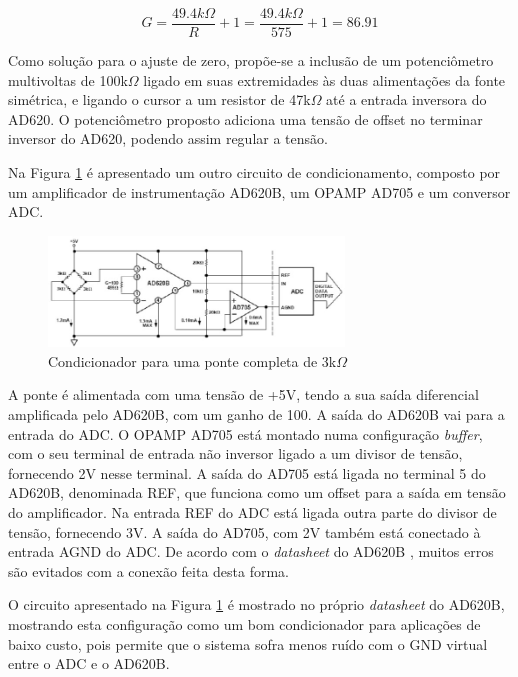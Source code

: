 \documentclass[a4paper]{instrumentacao}
\begin{document}
\begin{equation}
	G=\frac{49.4k\Omega}{R}+1=\frac{49.4k\Omega}{575}+1=86.91
	\label{eq:ganho-AD620}
\end{equation}

Como solução para o ajuste de zero, propõe-se a inclusão de um potenciômetro multivoltas de 100k$\Omega$ ligado em suas extremidades às duas alimentações da fonte simétrica, e ligando o cursor a um resistor de 47k$\Omega$ até a entrada inversora do AD620. O potenciômetro proposto adiciona uma tensão de offset no terminar inversor do AD620, podendo assim regular a tensão.

Na Figura \ref{fig:condicionador-2} é apresentado um outro circuito de condicionamento, composto por um amplificador de instrumentação AD620B, um OPAMP AD705 e um conversor ADC.

\begin{figure}[H]
\center
\includegraphics[width=0.7\textwidth]{condicionador_2.jpg}
\caption{Condicionador para uma ponte completa de 3k$\Omega$}
\label{fig:condicionador-2}
\end{figure}

A ponte é alimentada com uma tensão de +5V, tendo a sua saída diferencial amplificada pelo AD620B, com um ganho de 100. A saída do AD620B vai para a entrada do ADC. O OPAMP AD705 está montado numa configuração \textit{buffer}, com o seu terminal de entrada não inversor ligado a um divisor de tensão, fornecendo 2V nesse terminal. A saída do AD705 está ligada no terminal 5 do AD620B, denominada REF, que funciona como um offset para a saída em tensão do amplificador. Na entrada REF do ADC está ligada outra parte do divisor de tensão, fornecendo 3V. A saída do AD705, com 2V também está conectado à entrada AGND do ADC. De acordo com o \textit{datasheet} do AD620B \cite{datasheet-AD620}, muitos erros são evitados com a conexão feita desta forma.

O circuito apresentado na Figura \ref{fig:condicionador-2} é mostrado no próprio \textit{datasheet} do AD620B, mostrando esta configuração como um bom condicionador para aplicações de baixo custo, pois permite que o sistema sofra menos ruído com o GND virtual entre o ADC e o AD620B.
\end{document}

